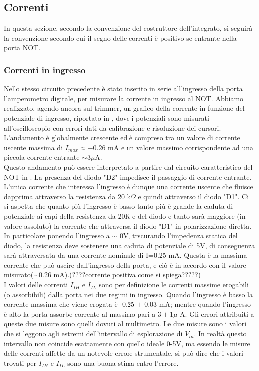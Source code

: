 \subsection{Correnti}
In questa sezione, secondo la convenzione del costruttore dell'integrato, si seguirà la convenzione secondo cui il segno delle correnti è positivo se entrante nella porta NOT.\\
\subsubsection{Correnti in ingresso}
Nello stesso circuito precedente è stato inserito in serie all'ingresso della porta l'amperometro digitale, per misurare la corrente in ingresso al NOT.
Abbiamo realizzato, agendo ancora sul trimmer, un grafico della corrente in funzione del potenziale di ingresso, riportato in , dove i potenziali sono misurati all'oscilloscopio con errori dati da calibrazione e risoluzione dei cursori.\\
L'andamento è globalmente crescente  ed è  compreso tra un valore di corrente uscente massima di $I_{max}\approx -0.26$ mA e un valore massimo corrispondente ad una piccola corrente entrante $\sim 3 \mu$A. \\
Questo andamento può essere interpretato a partire dal circuito caratteristico del NOT in . La presenza del diodo "D2" impedisce il passaggio di corrente entrante. L'unica corrente che interessa l'ingresso è dunque una corrente uscente che fluisce dapprima attraverso la resistenza da 20 k$\Omega$ e quindi attraverso il diodo "D1". Ci si aspetta che quanto più l'ingresso è basso tanto più è grande la caduta di potenziale ai capi della resistenza da 20K e del diodo e tanto sarà maggiore (in valore assoluto) la corrente che attraversa il diodo "D1" in polarizzazione diretta. In particolare ponendo l'ingresso a $\sim$ 0V, trscurando l'impedenza statica del diodo, la resistenza deve sostenere una caduta di potenziale di 5V, di conseguenza sarà attraversata da una corrente nominale di I=0.25 mA. Questa è la massima corrente che può uscire dall'ingresso della porta, e ciò è in accordo con il valore misurato($\sim$0.26 mA).(????corrente positiva come si spiega?????)\\
I valori delle correnti $I_{IH}$ e $I_{IL}$ sono per definizione le correnti massime erogabili (o assorbibili) dalla porta nei due regimi in ingresso. Quando l'ingresso è basso la corrente massima che viene erogata è -0.25 $\pm$ 0.03 mA; mentre quando l'ingresso è alto la porta assorbe corrente al massimo pari a $3 \pm 1 \mu$ A. Gli errori attribuiti a queste due misure sono quelli dovuti al multimetro. Le due misure sono i valori che si leggono agli estremi dell'intervallo di esplorazione di $V_{in}$. In realtà questo intervallo non coincide esattamente con quello ideale 0-5V, ma essendo le misure delle correnti affette da un notevole errore strumentale, si può dire che i valori trovati per $I_{IH}$ e $I_{IL}$ sono una buona stima entro l'errore.
